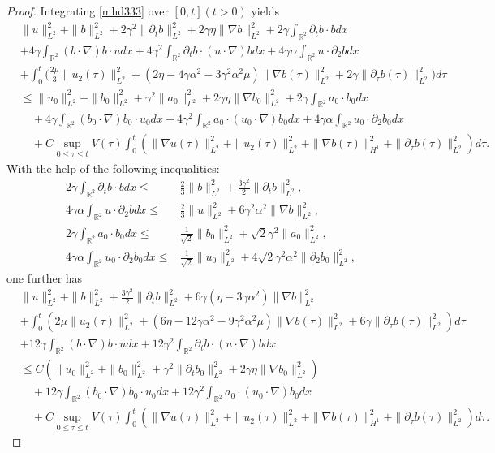 \documentclass[reqno,11pt]{amsart}
\def\R{\mathbb R}
\numberwithin{Thm}{section}
\begin{document}
\begin{proof}
Integrating \eqref{mhd333} over $[0,t](t>0)$ yields
\begin{align*}
&\|u\|^2_{L^2}+\|b\|^2_{L^2}+2\gamma^2\|\partial_tb\|^2_{L^2}
+2\gamma\eta\|\nabla b\|^2_{L^2}+2\gamma\int_{\R^2}\partial_tb\cdot bdx
\nonumber\\
&+4\gamma\int_{\R^2}(b\cdot\nabla) b\cdot udx+4\gamma^2\int_{\R^2}\partial_{t}b\cdot (u\cdot\nabla )bdx+
4\gamma\alpha\int_{\R^2}u\cdot\partial_2 bdx\nonumber\\
&+\int_{0}^t\bigg(\frac{2\mu}{3}\|u_2(\tau)\|^2_{L^2}+(2\eta-4\gamma\alpha^2-3\gamma^2\alpha^2\mu)\|\nabla b(\tau)\|^2_{L^2}+2\gamma\|\partial_{\tau}b(\tau)\|^2_{L^2}\bigg)d\tau\nonumber\\
&\leq\|u_0\|^2_{L^2}+\|b_0\|^2_{L^2}+\gamma^2\|a_0\|^2_{L^2}
+2\gamma\eta\|\nabla b_0\|^2_{L^2}+2\gamma\int_{\R^2}a_0\cdot b_0dx\nonumber \\
&\quad+4\gamma\int_{\R^2}(b_0\cdot\nabla) b_0\cdot u_0dx+4\gamma^2\int_{\R^2}a_0\cdot (u_0\cdot\nabla) b_0dx+
4\gamma\alpha\int_{\R^2}u_0\cdot\partial_2 b_0dx\nonumber\\
&\quad+C\sup_{0\leq\tau\leq t}V(\tau)\int_0^t\left(\|\nabla u(\tau)\|_{L^{2}}^2+\|u_2(\tau)\|_{L^2}^2+\|\nabla b(\tau)\|_{H^1}^2+\|\partial_{\tau}b(\tau)\|_{L^{2}}^2\right)d\tau.
\end{align*}
With the help of the following inequalities:
\begin{align*}
2\gamma\int_{\R^2}\partial_tb\cdot bdx
\leq & \frac{2}{3}\|b\|_{L^2}^2+\frac{3\gamma^2}{2}\|\partial_t b\|_{L^2}^2, \\
4\gamma\alpha\int_{\R^2}u\cdot \partial_2bdx
\leq & \frac{2}{3}\|u\|_{L^2}^2+6\gamma^2\alpha^2\|\nabla b\|_{L^2}^2,\\
2\gamma\int_{\R^2}a_0\cdot b_0dx
\leq & \frac{1}{\sqrt{2}}\|b_0\|_{L^2}^2+\sqrt{2}\gamma^2\|a_0\|_{L^2}^2,\\
4\gamma\alpha\int_{\R^2}u_0\cdot\partial_2 b_0dx
\leq & \frac{1}{\sqrt{2}}\|u_0\|_{L^2}^2+4\sqrt{2}\gamma^2\alpha^2\|\partial_2 b_0\|_{L^2}^2,
\end{align*}
one further has
\begin{align}\label{energy1}
&\|u\|^2_{L^2}+\|b\|^2_{L^2}+\frac{3\gamma^2}{2}\|\partial_tb\|^2_{L^2}
+6\gamma(\eta-3\gamma\alpha^2)\|\nabla b\|^2_{L^2}\nonumber\\
&
+\int_{0}^t\left(2\mu\|u_2(\tau)\|^2_{L^2}+(6\eta-12\gamma\alpha^2-9\gamma^2\alpha^2\mu)\|\nabla b(\tau)\|^2_{L^2}+6\gamma\|\partial_{\tau}b(\tau)\|^2_{L^2}\right)d\tau\nonumber\\
&+12\gamma\int_{\R^2}(b\cdot\nabla) b\cdot udx+12\gamma^2\int_{\R^2}\partial_{t}b\cdot (u\cdot\nabla) bdx\nonumber\\
&\leq C\left(\|u_0\|^2_{L^2}+\|b_0\|^2_{L^2}+\gamma^2\|\partial_tb_0\|^2_{L^2}
+2\gamma\eta\|\nabla b_0\|^2_{L^2}\right)\nonumber\\
&\quad+12\gamma\int_{\R^2}(b_0\cdot\nabla) b_0\cdot u_0dx+12\gamma^2\int_{\R^2}a_0\cdot( u_0\cdot\nabla) b_0dx\nonumber\\
&\quad+C\sup_{0\leq\tau\leq t}V(\tau)\int_0^t\left(\|\nabla u(\tau)\|_{L^{2}}^2+\|u_2(\tau)\|_{L^2}^2+\|\nabla b(\tau)\|_{H^1}^2+\|\partial_{\tau}b(\tau)\|_{L^{2}}^2\right)d\tau.
\end{align}



\end{proof}
\end{document}
